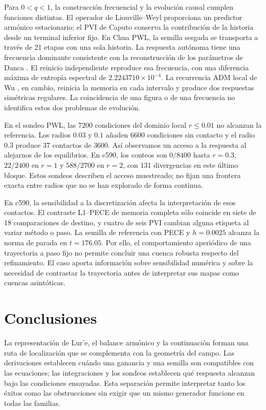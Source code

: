 Para \(0<q<1\), la construcción frecuencial y la evolución causal cumplen
funciones distintas. El operador de Liouville--Weyl proporciona un predictor
armónico estacionario; el PVI de Caputo conserva la contribución de la
historia desde un terminal inferior fijo. En Chua PWL, la semilla sesgada
se transporta a través de 21 etapas con una sola historia. La respuesta
autónoma tiene una frecuencia dominante consistente con la reconstrucción
de los parámetros de Danca \cite{Danca2017}. El reinicio independiente
reproduce esa frecuencia, con una diferencia máxima de entropía espectral
de \(2.2243710\times10^{-4}\). La recurrencia ADM local de Wu
\cite{Wu2023ArctanChua}, en cambio, reinicia la memoria en cada intervalo
y produce dos respuestas simétricas regulares. La coincidencia de una
figura o de una frecuencia no identifica estos dos problemas de evolución.

\ifHAFOBasinMaterial
En el sondeo PWL, las \(7200\) condiciones del dominio local
\(r\leq0.01\) no alcanzan la referencia. Los radios \(0.03\) y \(0.1\)
añaden \(6600\) condiciones sin contacto y el radio \(0.3\) produce
37 contactos de \(3600\). Así observamos un acceso a la respuesta al
alejarnos de los equilibrios. En c590, los conteos son \(0/8400\) hasta
\(r=0.3\), \(22/2400\) en \(r=1\) y \(588/2700\) en \(r=2\),
con 131 divergencias en este último bloque. Estos sondeos describen el
acceso muestreado; no fijan una frontera exacta entre radios que no se
han explorado de forma continua.
\fi

En c590, la sensibilidad a la discretización afecta la interpretación de
esos contactos. El contraste L1--PECE de memoria completa sólo coincide en
siete de 18 comparaciones de destino, y cuatro de seis PVI cambian alguna
etiqueta al variar método o paso. La semilla de referencia con PECE y
\(h=0.0025\) alcanza la norma de parada en \(t=176.05\). Por ello,
el comportamiento aperiódico de una trayectoria a paso fijo no permite
concluir una cuenca robusta respecto del refinamiento. El caso aporta
información sobre sensibilidad numérica y sobre la necesidad de contrastar
la trayectoria antes de interpretar sus mapas como cuencas asintóticas.

\section{Conclusiones}
\label{sec:conclusiones}

La representación de Lur'e, el balance armónico y la continuación forman
una ruta de localización que se complementa con la geometría del campo.
Las derivaciones establecen cuándo una ganancia y una semilla son
compatibles con las ecuaciones; las integraciones y los sondeos establecen
qué respuesta alcanzan bajo las condiciones ensayadas. Esta separación
permite interpretar tanto los éxitos como las obstrucciones sin exigir
que un mismo generador funcione en todas las familias.

